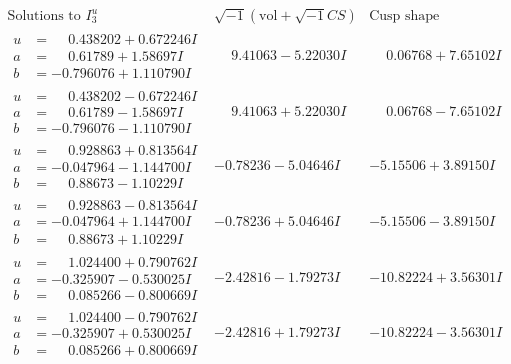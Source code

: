 \documentclass[1p]{elsarticle_modified}
\theoremstyle{definition}
\newcommand{\I}{\sqrt{-1}}
\begin{document}
$$\begin{array}{c|c|c}  
\text{Solutions to }I^u_{3}& \I (\text{vol} + \sqrt{-1}CS) & \text{Cusp shape}\\
 \hline 
\begin{aligned}
u &= \phantom{-}0.438202 + 0.672246 I \\
a &= \phantom{-}0.61789 + 1.58697 I \\
b &= -0.796076 + 1.110790 I\end{aligned}
 & \phantom{-}9.41063 - 5.22030 I & \phantom{-}0.06768 + 7.65102 I \\ \hline\begin{aligned}
u &= \phantom{-}0.438202 - 0.672246 I \\
a &= \phantom{-}0.61789 - 1.58697 I \\
b &= -0.796076 - 1.110790 I\end{aligned}
 & \phantom{-}9.41063 + 5.22030 I & \phantom{-}0.06768 - 7.65102 I \\ \hline\begin{aligned}
u &= \phantom{-}0.928863 + 0.813564 I \\
a &= -0.047964 - 1.144700 I \\
b &= \phantom{-}0.88673 - 1.10229 I\end{aligned}
 & -0.78236 - 5.04646 I & -5.15506 + 3.89150 I \\ \hline\begin{aligned}
u &= \phantom{-}0.928863 - 0.813564 I \\
a &= -0.047964 + 1.144700 I \\
b &= \phantom{-}0.88673 + 1.10229 I\end{aligned}
 & -0.78236 + 5.04646 I & -5.15506 - 3.89150 I \\ \hline\begin{aligned}
u &= \phantom{-}1.024400 + 0.790762 I \\
a &= -0.325907 - 0.530025 I \\
b &= \phantom{-}0.085266 - 0.800669 I\end{aligned}
 & -2.42816 - 1.79273 I & -10.82224 + 3.56301 I \\ \hline\begin{aligned}
u &= \phantom{-}1.024400 - 0.790762 I \\
a &= -0.325907 + 0.530025 I \\
b &= \phantom{-}0.085266 + 0.800669 I\end{aligned}
 & -2.42816 + 1.79273 I & -10.82224 - 3.56301 I \\ \hline\begin{aligned}

\end{aligned}
\end{array}$$
\end{document}
